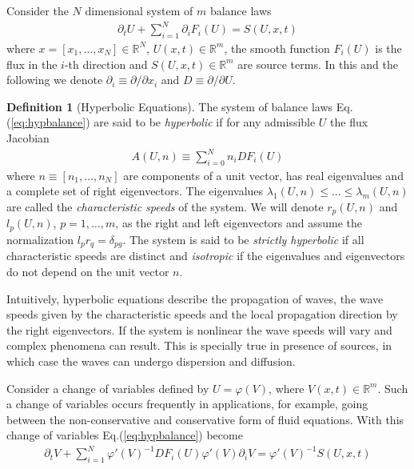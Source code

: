 \documentclass[11pt, reqno]{amsart}
\newcommand{\eqr}[1]{Eq.\thinspace(#1)}
\newcommand{\spfrac}[2]{{\partial_{#1}} {#2}}
\theoremstyle{definition}
\newtheorem{dfn}{Definition}
\begin{document}
Consider the $N$ dimensional system of $m$ balance laws
\begin{align}
  \spfrac{t}{U} + \sum_{i=1}^N \spfrac{i}{F_i(U)} = S(U,x,t) 
  \label{eq:hypbalance}
\end{align}
where $x = [x_1,\ldots,x_N] \in \mathbb{R}^N$, $U(x,t) \in
\mathbb{R}^m$, the smooth function $F_i(U)$ is the flux in the $i$-th
direction and $S(U,x,t) \in \mathbb{R}^m$ are source terms. In this
and the following we denote $\partial_i \equiv \partial/\partial x_i$
and $D \equiv \partial/\partial U$.

\begin{dfn}[Hyperbolic Equations]
  The system of balance laws \eqr{\ref{eq:hypbalance}} are said to be
  \emph{hyperbolic} if for any admissible $U$ the flux Jacobian
  \begin{align}
    A(U,n) \equiv \sum_{i=0}^N n_i DF_i(U)
  \end{align}
  where $n\equiv [n_1,\ldots,n_N]$ are components of a unit vector,
  has real eigenvalues and a complete set of right eigenvectors. The
  eigenvalues $\lambda_1(U,n) \le \ldots \le \lambda_m(U,n)$ are
  called the \emph{characteristic speeds} of the system. We will
  denote $r_p(U,n)$ and $l_p(U,n)$, $p=1,\ldots,m$, as the right and
  left eigenvectors and assume the normalization $l_p r_q =
  \delta_{pg}$.  The system is said to be \emph{strictly hyperbolic}
  if all characteristic speeds are distinct and \emph{isotropic} if
  the eigenvalues and eigenvectors do not depend on the unit vector
  $n$.
\end{dfn}

Intuitively, hyperbolic equations describe the propagation of waves,
the wave speeds given by the characteristic speeds and the local
propagation direction by the right eigenvectors. If the system is
nonlinear the wave speeds will vary and complex phenomena can
result. This is specially true in presence of sources, in which case
the waves can undergo dispersion and diffusion.

Consider a change of variables defined by $U=\varphi(V)$, where
$V(x,t) \in \mathbb{R}^m$. Such a change of variables occurs
frequently in applications, for example, going between the
non-conservative and conservative form of fluid equations. With this
change of variables \eqr{\ref{eq:hypbalance}} become
\begin{align}
  \spfrac{t}{V} + \sum_{i=1}^N 
  \varphi'(V)^{-1}
  DF_i(U)
  \varphi'(V)
  \spfrac{i}{V}
  = 
  \varphi'(V)^{-1}S(U,x,t)
  \label{eq:hypbalance}
\end{align}
\end{document}
